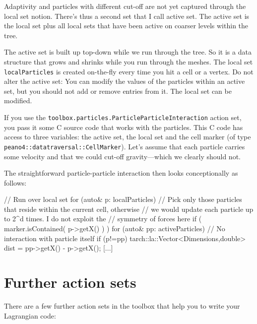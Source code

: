 Adaptivity and particles with different cut-off are not yet captured through the
local set notion.
There's thus a second set that I call active set. 
The active set is the local set plus all local sets that have been active on
coarser levels within the tree.

\begin{definition}
 The active set is built up top-down while we run through the
 tree.
 So it is a data structure that grows and shrinks while you run through the
 meshes.
 The local set \texttt{localParticles} is created on-the-fly every time you hit
 a cell or a vertex.
 Do not alter the active set: You can modify the values of the particles within
 an active set, but you should not add or remove entries from it.
 The local set can be modified.
\end{definition}


If you use the \texttt{toolbox.particles.ParticleParticleInteraction} action
set, you pass it some C source code that works with the particles.
This C code has access to three variables: the active set, the local set and the
cell marker (of type \linebreak \texttt{peano4::datatraversal::CellMarker}).
Let's assume that each particle carries some velocity and that we could cut-off
gravity---which we clearly should not.


The straightforward particle-particle interaction then looks conceptionally as
follows:

\begin{code}
// Run over local set
for (auto& p: localParticles) {
  // Pick only those particles that reside within the current cell, otherwise
  // we would update each particle up to 2^d times. I do not exploit the
  // symmetry of forces here
  if ( marker.isContained( p->getX() ) ) {
    for (auto& pp: activeParticles) {
      // No interaction with particle itself
      if (p!=pp) {
        tarch::la::Vector<Dimensions,double> dist = pp->getX() - p->getX();
        [...]
      }
    }
  }
}
\end{code}




\section{Further action sets}

There are a few further action sets in the toolbox that help you to write your
Lagrangian code:



